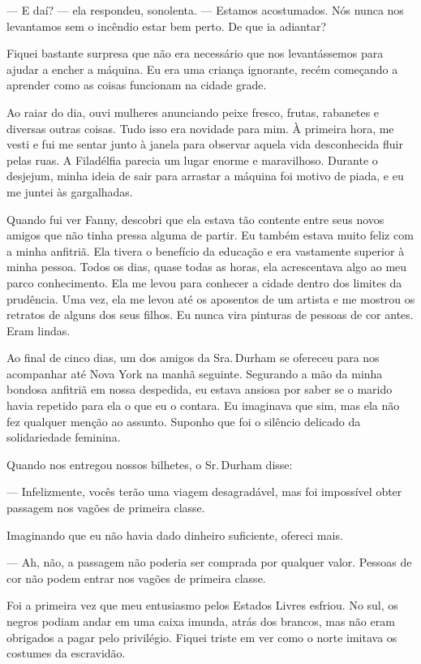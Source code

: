 --- E daí? --- ela respondeu,
sonolenta. --- Estamos acostumados. Nós nunca nos levantamos sem o
incêndio estar bem perto. De que ia adiantar?

Fiquei bastante surpresa que não era
necessário que nos levantássemos para ajudar a encher a máquina. Eu era
uma criança ignorante, recém começando a aprender como as coisas
funcionam na cidade grade.

Ao raiar do dia, ouvi mulheres
anunciando peixe fresco, frutas, rabanetes e diversas outras coisas.
Tudo isso era novidade para mim. À primeira hora, me vesti e fui me
sentar junto à janela para observar aquela vida desconhecida fluir pelas
ruas. A Filadélfia parecia um lugar enorme e maravilhoso. Durante o
desjejum, minha ideia de sair para arrastar a máquina foi motivo de
piada, e eu me juntei às gargalhadas.

Quando fui ver Fanny, descobri que ela
estava tão contente entre seus novos amigos que não tinha pressa alguma
de partir. Eu também estava muito feliz com a minha anfitriã. Ela tivera
o benefício da educação e era vastamente superior à minha pessoa. Todos
os dias, quase todas as horas, ela acrescentava algo ao meu parco
conhecimento. Ela me levou para conhecer a cidade dentro dos limites da
prudência. Uma vez, ela me levou até os aposentos de um artista e me
mostrou os retratos de alguns dos seus filhos. Eu nunca vira pinturas de
pessoas de cor antes. Eram lindas.

Ao final de cinco dias, um dos amigos
da Sra.\,Durham se ofereceu para nos acompanhar até Nova York na manhã
seguinte. Segurando a mão da minha bondosa anfitriã em nossa despedida,
eu estava ansiosa por saber se o marido havia repetido para ela o que eu
o contara. Eu imaginava que sim, mas ela não fez qualquer menção ao
assunto. Suponho que foi o silêncio delicado da solidariedade feminina.

Quando nos entregou nossos bilhetes, o
Sr.\,Durham disse:

--- Infelizmente, vocês terão uma viagem desagradável, mas foi
impossível obter passagem nos vagões de primeira classe.

Imaginando que eu não havia dado
dinheiro suficiente, ofereci mais.

--- Ah, não, a passagem não poderia ser comprada por qualquer valor.
Pessoas de cor não podem entrar nos vagões de primeira classe.

Foi a primeira vez que meu entusiasmo
pelos Estados Livres esfriou. No sul, os negros podiam andar em uma
caixa imunda, atrás dos brancos, mas não eram obrigados a pagar pelo
privilégio. Fiquei triste em ver como o norte imitava os costumes da
escravidão.

